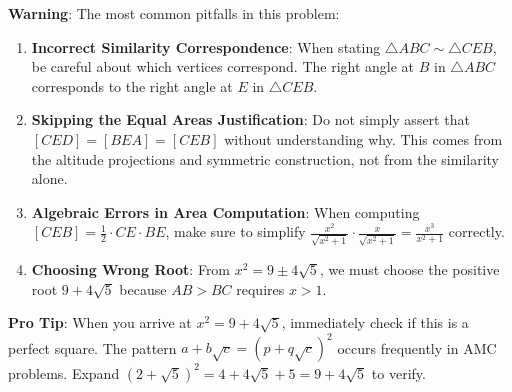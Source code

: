 \documentclass[]{article}
\begin{document}
\begin{warningbox}
\textbf{Warning}: The most common pitfalls in this problem:

\begin{enumerate}
    \item \textbf{Incorrect Similarity Correspondence}: When stating $\triangle ABC \sim \triangle CEB$, be careful about which vertices correspond. The right angle at $B$ in $\triangle ABC$ corresponds to the right angle at $E$ in $\triangle CEB$.
    
    \item \textbf{Skipping the Equal Areas Justification}: Do not simply assert that $[CED] = [BEA] = [CEB]$ without understanding why. This comes from the altitude projections and symmetric construction, not from the similarity alone.
    
    \item \textbf{Algebraic Errors in Area Computation}: When computing $[CEB] = \frac{1}{2} \cdot CE \cdot BE$, make sure to simplify $\frac{x^2}{\sqrt{x^2+1}} \cdot \frac{x}{\sqrt{x^2+1}} = \frac{x^3}{x^2+1}$ correctly.
    
    \item \textbf{Choosing Wrong Root}: From $x^2 = 9 \pm 4\sqrt{5}$, we must choose the positive root $9 + 4\sqrt{5}$ because $AB > BC$ requires $x > 1$.
\end{enumerate}
\end{warningbox}

\begin{tipbox}
\textbf{Pro Tip}: When you arrive at $x^2 = 9 + 4\sqrt{5}$, immediately check if this is a perfect square. The pattern $a + b\sqrt{c} = (p + q\sqrt{c})^2$ occurs frequently in AMC problems. Expand $(2 + \sqrt{5})^2 = 4 + 4\sqrt{5} + 5 = 9 + 4\sqrt{5}$ to verify.
\end{tipbox}
\end{document}
